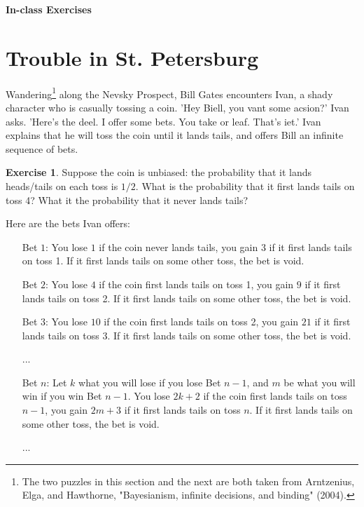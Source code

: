 \documentclass[11pt]{article}
\theoremstyle{definition}
\newtheorem{exer}{Exercise}
\begin{document}




\begin{center}
{\LARGE \bf In-class Exercises}
\end{center}

\smallskip

\section{Trouble in St. Petersburg}

Wandering\footnote{The two puzzles in this section and the next are both taken from Arntzenius, Elga, and Hawthorne, "Bayesianism, infinite decisions, and binding" (2004).} along the Nevsky Prospect, Bill Gates encounters Ivan, a shady character who is casually tossing a coin. 'Hey Biell, you vant some acsion?' Ivan asks. 'Here's the deel. I offer some bets. You take or leaf. That's iet.' Ivan explains that he will toss the coin until it lands tails, and offers Bill an infinite sequence of bets.

\begin{exer}
Suppose the coin is unbiased: the probability that it lands heads/tails on each toss is $1/2$. What is the probability that it first lands tails on toss 4? What it the probability that it never lands tails?
\end{exer}

Here are the bets Ivan offers:
\begin{enumerate}[leftmargin=2 \parindent]
\item[Bet $1$:] You lose $1$ if the coin never lands tails, you gain $3$ if it first lands tails on toss 1. If it first lands tails on some other toss, the bet is void.
\item[Bet $2$:] You lose $4$ if the coin first lands tails on toss 1, you gain $9$ if it first lands tails on toss 2. If it first lands tails on some other toss, the bet is void.
\item[Bet $3$:] You lose $10$ if the coin first lands tails on toss 2, you gain $21$ if it first lands tails on toss 3. If it first lands tails on some other toss, the bet is void.
\item[...]
\item[Bet $n$:] Let $k$ what you will lose if you lose Bet $n-1$, and $m$ be what you will win if you win Bet $n-1$. You lose $2k+2$ if the coin first lands tails on toss $n-1$, you gain $2m+3$ if it first lands tails on toss $n$. If it first lands tails on some other toss, the bet is void.
\item[...]
\end{enumerate}
\end{document}
